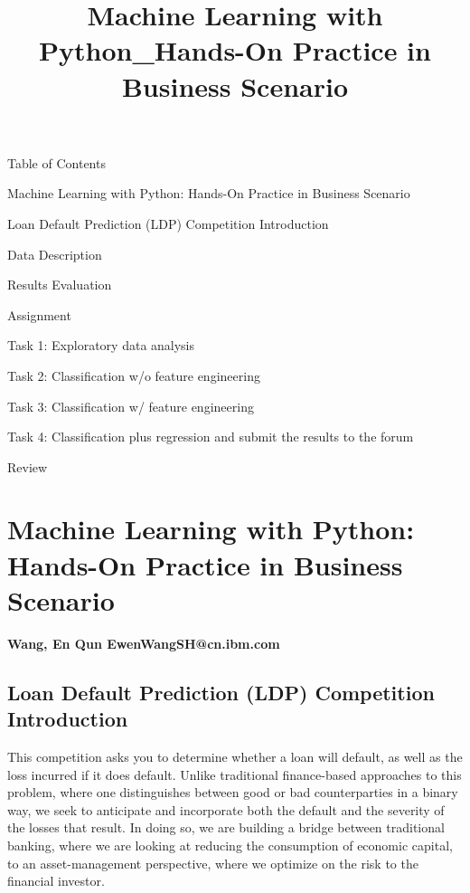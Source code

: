 \documentclass[11pt]{article}
\title{Machine Learning with Python\_Hands-On Practice in Business Scenario}
\begin{document}
    
    
    \maketitle
    
    

    
    Table of Contents{}

{Machine Learning with Python: Hands-On Practice in Business Scenario}

{Loan Default Prediction (LDP) Competition Introduction}

{Data Description}

{Results Evaluation}

{Assignment}

{Task 1: Exploratory data analysis}

{Task 2: Classification w/o feature engineering}

{Task 3: Classification w/ feature engineering}

{Task 4: Classification plus regression and submit the results to the
forum}

{Review}

    \hypertarget{machine-learning-with-python-hands-on-practice-in-business-scenario}{%
\section{Machine Learning with Python: Hands-On Practice in Business
Scenario}\label{machine-learning-with-python-hands-on-practice-in-business-scenario}}

\textbf{Wang, En Qun EwenWangSH@cn.ibm.com}

\hypertarget{loan-default-prediction-ldp-competition-introduction}{%
\subsection{Loan Default Prediction (LDP) Competition
Introduction}\label{loan-default-prediction-ldp-competition-introduction}}

This competition asks you to determine whether a loan will default, as
well as the loss incurred if it does default. Unlike traditional
finance-based approaches to this problem, where one distinguishes
between good or bad counterparties in a binary way, we seek to
anticipate and incorporate both the default and the severity of the
losses that result. In doing so, we are building a bridge between
traditional banking, where we are looking at reducing the consumption of
economic capital, to an asset-management perspective, where we optimize
on the risk to the financial investor.
\end{document}
